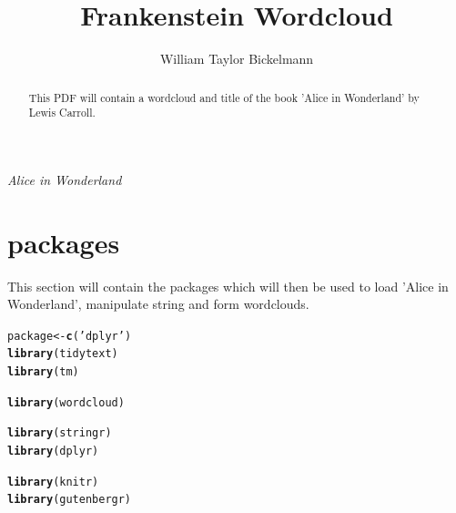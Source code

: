 \documentclass{article}\usepackage[]{graphicx}\usepackage[]{color}
\makeatletter
\newcommand{\hlstr}[1]{\textcolor[rgb]{0.192,0.494,0.8}{#1}}%
\newcommand{\hlstd}[1]{\textcolor[rgb]{0.345,0.345,0.345}{#1}}%
\newcommand{\hlkwb}[1]{\textcolor[rgb]{0.69,0.353,0.396}{#1}}%
\newcommand{\hlkwd}[1]{\textcolor[rgb]{0.737,0.353,0.396}{\textbf{#1}}}%
\newenvironment{kframe}{%
 \def\at@end@of@kframe{}%
 \ifinner\ifhmode%
  \def\at@end@of@kframe{\end{minipage}}%
  \begin{minipage}{\columnwidth}%
 \fi\fi%
 \def\FrameCommand##1{\hskip\@totalleftmargin \hskip-\fboxsep
 \colorbox{shadecolor}{##1}\hskip-\fboxsep
     \hskip-\linewidth \hskip-\@totalleftmargin \hskip\columnwidth}%
 \MakeFramed {\advance\hsize-\width
   \@totalleftmargin\z@ \linewidth\hsize
   \@setminipage}}%
 {\par\unskip\endMakeFramed%
 \at@end@of@kframe}
\newenvironment{knitrout}{}{} %
\makeatother
\begin{document}
\title{Frankenstein Wordcloud}
\author{William Taylor Bickelmann}
\maketitle

\begin{abstract}
This PDF will contain a wordcloud and title of the book 'Alice in Wonderland' by Lewis Carroll.

\end{abstract}

\textit{Alice in Wonderland}

\section{packages}
This section will contain the packages which will then be used to load 'Alice in Wonderland', manipulate string and form wordclouds.

\begin{knitrout}
\color{fgcolor}\begin{kframe}
\begin{alltt}
\hlstd{package}\hlkwb{<-}\hlkwd{c}\hlstd{(}\hlstr{'dplyr'}\hlstd{)}
\hlkwd{library}\hlstd{(tidytext)}
\hlkwd{library}\hlstd{(tm)}
\end{alltt}


{\ttfamily\noindent\itshape\color{messagecolor}{\#\# Loading required package: NLP}}\begin{alltt}
\hlkwd{library}\hlstd{(wordcloud)}
\end{alltt}


{\ttfamily\noindent\itshape\color{messagecolor}{\#\# Loading required package: RColorBrewer}}\begin{alltt}
\hlkwd{library}\hlstd{(stringr)}
\hlkwd{library}\hlstd{(dplyr)}
\end{alltt}


{\ttfamily\noindent\itshape\color{messagecolor}{\#\# \\\#\# Attaching package: 'dplyr'}}

{\ttfamily\noindent\itshape\color{messagecolor}{\#\# The following objects are masked from 'package:stats':\\\#\# \\\#\#\ \ \ \  filter, lag}}

{\ttfamily\noindent\itshape\color{messagecolor}{\#\# The following objects are masked from 'package:base':\\\#\# \\\#\#\ \ \ \  intersect, setdiff, setequal, union}}\begin{alltt}
\hlkwd{library}\hlstd{(knitr)}
\hlkwd{library}\hlstd{(gutenbergr)}
\end{alltt}
\end{kframe}
\end{knitrout}
\end{document}
